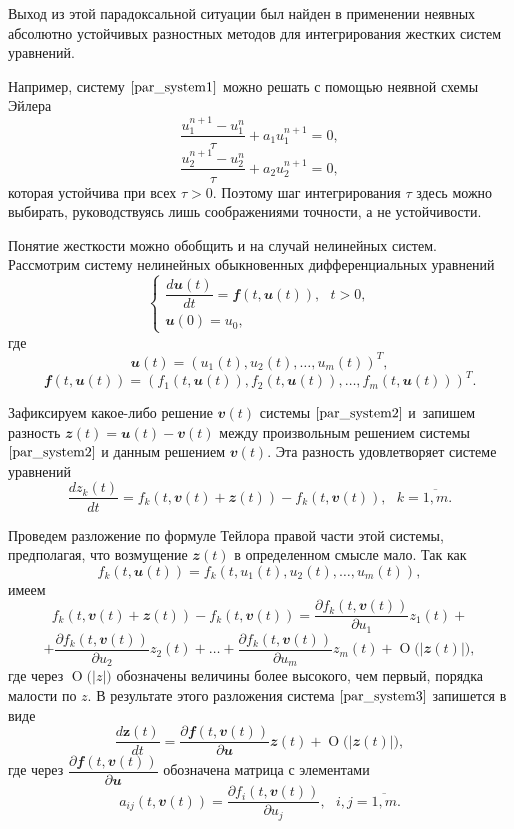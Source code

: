 \documentclass[11pt,a4paper,twoside,listtotoc,bibtotoc]{report}
\numberwithin{equation}{section}
\theoremstyle{definition}
\theoremstyle{plain}
\newcommand{\bigO}[1]{\ensuremath{\operatorname{O}\bigl(#1\bigr)}}
\newcommand{\vfunc}[1]{\mathbfit{#1}}
\begin{document}
Выход из этой парадоксальной ситуации был найден в применении неявных
абсолютно устойчивых разностных методов для интегрирования жестких систем уравнений.

Например, систему $\eqref{par_system1}$ можно решать с помощью неявной схемы Эйлера
%
$$
    \dfrac{u_1^{n+1} - u_1^n}{\tau} + a_1u_1^{n+1} = 0,
$$
%
$$
    \dfrac{u_2^{n+1} - u_2^n}{\tau} + a_2u_2^{n+1} = 0,
$$
%
которая устойчива при всех $\tau>0$. Поэтому шаг интегрирования $\tau$
здесь можно выбирать, руководствуясь лишь соображениями точности, а не
устойчивости.

Понятие жесткости можно обобщить и на случай нелинейных систем.
Рассмотрим систему нелинейных обыкновенных дифференциальных уравнений
%
\begin{equation}
%
    \label{par_system2}
    \begin{cases}
        \dfrac{d\vfunc{u}(t)}{dt} = \vfunc{f}(t, \vfunc{u}(t)),~~~t > 0,\\
        \vfunc{u}(0)=u_0,
    \end{cases}
%
\end{equation}
%
где
%
$$
    \vfunc{u}(t)=\left(u_1(t), u_2(t),\ldots, u_m(t)\right)^T,
$$
%
$$
    \vfunc{f}(t, \vfunc{u}(t)) = \left(f_1(t, \vfunc{u}(t)), f_2(t, \vfunc{u}(t)),
    \ldots, f_m(t, \vfunc{u}(t))\right)^T.
$$
%

Зафиксируем
какое-либо решение $\vfunc{v}(t)$ системы $\eqref{par_system2}$ и~запишем
разность $\vfunc{z}(t)=\vfunc{u}(t)-\vfunc{v}(t)$ между произвольным
решением системы $\eqref{par_system2}$ и данным решением $\vfunc{v}(t)$.
Эта разность удовлетворяет системе уравнений
%
\begin{equation}
%
    \label{par_system3}
    \dfrac{dz_k(t)}{dt} = f_k(t, \vfunc{v}(t) +
    \vfunc{z}(t)) - f_k(t, \vfunc{v}(t)),~~~k=\overline{1,m}.
%
\end{equation}
%

Проведем разложение по формуле Тейлора правой части этой системы,
предполагая, что возмущение $\vfunc{z}(t)$ в определенном смысле мало. Так как
%
$$
    f_k(t, \vfunc{u}(t)) = f_k(t, u_1(t), u_2(t), \ldots, u_m(t)),
$$
%
имеем
%
$$
    f_k(t, \vfunc{v}(t) + \vfunc{z}(t)) - f_k(t, \vfunc{v}(t)) =
    \dfrac{\partial f_k(t, \vfunc{v}(t))}{\partial u_1}z_1(t) +
$$
%
$$
    + \dfrac{\partial f_k(t, \vfunc{v}(t))}{\partial u_2}z_2(t) +
    \ldots + \dfrac{\partial f_k(t, \vfunc{v}(t))}{\partial u_m}z_m(t)
    + \bigO{|\vfunc{z}(t)|},
$$
%
где через $\bigO{|z|}$ обозначены величины более высокого, чем первый,
порядка малости по $z$. В результате этого разложения система
$\eqref{par_system3}$ запишется в виде
%
\begin{equation}
%
    \label{par_system4}
    \dfrac{d\textbf{z}(t)}{dt} = \dfrac{\partial
    \vfunc{f}(t, \vfunc{v}(t))}{\partial \vfunc{u}}\vfunc{z}(t)
    +\bigO{|\vfunc{z}(t)|},
%
\end{equation}
%
где через $\dfrac{\partial
    \vfunc{f}(t, \vfunc{v}(t))}{\partial \vfunc{u}}$
обозначена матрица с элементами
%
$$
    a_{ij}
    (t,\vfunc{v}(t)) = \dfrac{\partial f_i(t, \vfunc{v}(t))}
    {\partial u_j},~~~i,j=\overline{1,m}.
$$
%
\end{document}
